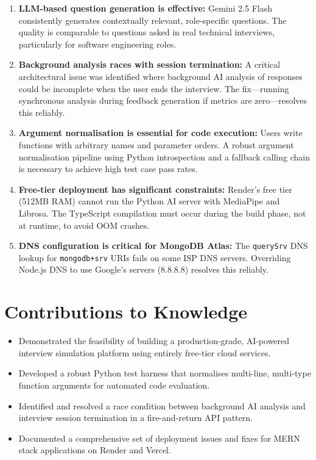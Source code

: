 \begin{enumerate}
    \item \textbf{LLM-based question generation is effective:} Gemini 2.5 Flash consistently generates contextually relevant, role-specific questions. The quality is comparable to questions asked in real technical interviews, particularly for software engineering roles.

    \item \textbf{Background analysis races with session termination:} A critical architectural issue was identified where background AI analysis of responses could be incomplete when the user ends the interview. The fix---running synchronous analysis during feedback generation if metrics are zero---resolves this reliably.

    \item \textbf{Argument normalisation is essential for code execution:} Users write functions with arbitrary names and parameter orders. A robust argument normalisation pipeline using Python introspection and a fallback calling chain is necessary to achieve high test case pass rates.

    \item \textbf{Free-tier deployment has significant constraints:} Render's free tier (512MB RAM) cannot run the Python AI server with MediaPipe and Librosa. The TypeScript compilation must occur during the build phase, not at runtime, to avoid OOM crashes.

    \item \textbf{DNS configuration is critical for MongoDB Atlas:} The \texttt{querySrv} DNS lookup for \texttt{mongodb+srv} URIs fails on some ISP DNS servers. Overriding Node.js DNS to use Google's servers (8.8.8.8) resolves this reliably.
\end{enumerate}

\section{Contributions to Knowledge}

\begin{itemize}
    \item Demonstrated the feasibility of building a production-grade, AI-powered interview simulation platform using entirely free-tier cloud services.
    \item Developed a robust Python test harness that normalises multi-line, multi-type function arguments for automated code evaluation.
    \item Identified and resolved a race condition between background AI analysis and interview session termination in a fire-and-return API pattern.
    \item Documented a comprehensive set of deployment issues and fixes for MERN stack applications on Render and Vercel.
\end{itemize}

